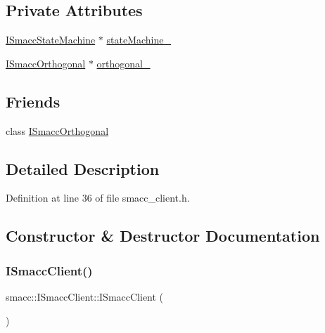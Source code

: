 \subsection*{Private Attributes}
\begin{DoxyCompactItemize}
\item 
\hyperlink{classsmacc_1_1ISmaccStateMachine}{I\+Smacc\+State\+Machine} $\ast$ \hyperlink{classsmacc_1_1ISmaccClient_a926e4f2ae796def63d48dca389a48c47}{state\+Machine\+\_\+}
\item 
\hyperlink{classsmacc_1_1ISmaccOrthogonal}{I\+Smacc\+Orthogonal} $\ast$ \hyperlink{classsmacc_1_1ISmaccClient_a571c7f672d9c90128b5498aefc27c136}{orthogonal\+\_\+}
\end{DoxyCompactItemize}
\subsection*{Friends}
\begin{DoxyCompactItemize}
\item 
class \hyperlink{classsmacc_1_1ISmaccClient_a7205cc84a71fea903124d54d01e99a68}{I\+Smacc\+Orthogonal}
\end{DoxyCompactItemize}


\subsection{Detailed Description}


Definition at line 36 of file smacc\+\_\+client.\+h.



\subsection{Constructor \& Destructor Documentation}
\mbox{\label{classsmacc_1_1ISmaccClient_a40222ad8b9b7962755434025b1fd5ae7}} 
\subsubsection{\texorpdfstring{I\+Smacc\+Client()}{ISmaccClient()}}
{\footnotesize\ttfamily smacc\+::\+I\+Smacc\+Client\+::\+I\+Smacc\+Client (\begin{DoxyParamCaption}{ }\end{DoxyParamCaption})}



